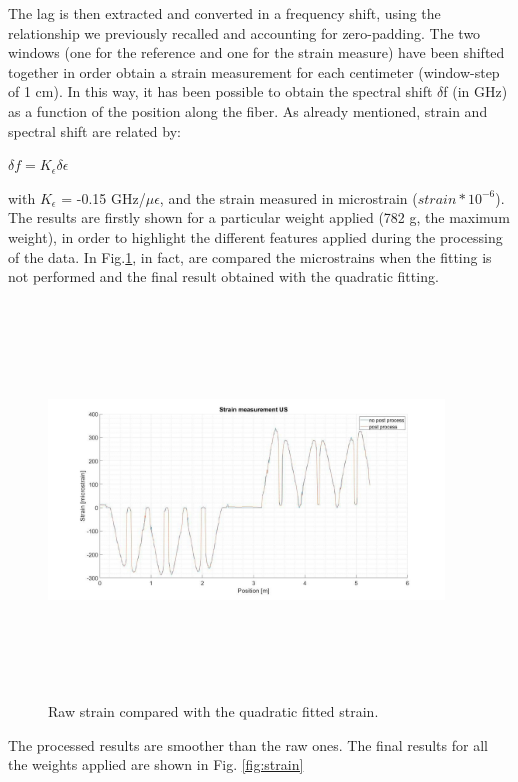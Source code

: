 The lag is then extracted and converted in a frequency shift, using the relationship we previously recalled and accounting for zero-padding.
The two windows (one for the reference and one for the strain measure) have been shifted together in order obtain a strain measurement for each centimeter (window-step of 1 cm).
In this way, it has been possible to obtain the spectral shift $\delta$f (in GHz) as a function of the position along the fiber. As already mentioned, strain and spectral shift are related by:
\begin{center}
$\delta f = K_{\epsilon}\delta \epsilon$
\end{center}
with $K_{\epsilon}$ = -0.15 GHz/$\mu\epsilon$, and the strain measured in microstrain ($strain*10^{-6}$). The results are firstly shown for a particular weight applied (782 g, the maximum weight), in order to highlight the different features applied during the processing of the data. In Fig.\ref{fig:ok}, in fact, are compared the microstrains when the fitting is not performed and the final result obtained with the quadratic fitting.

\begin{figure}[H]
	\centering
	\includegraphics[height=10.5cm, width=10.5cm, keepaspectratio]{img/ok.jpg}
	\caption{Raw strain compared with the quadratic fitted strain.}\label{fig:ok}
\end{figure}
The processed results are smoother than the raw ones. The final results for all the weights applied are shown in Fig. \ref{fig:strain}

